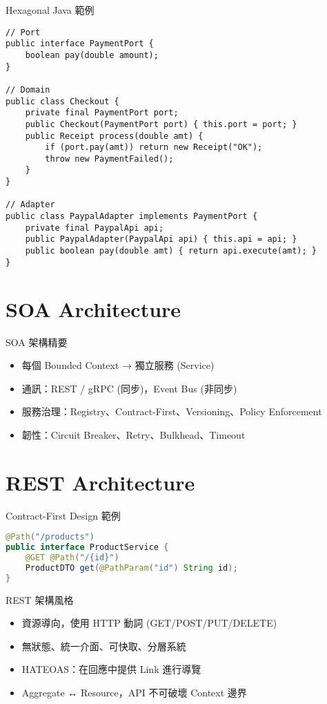\documentclass[UTF8]{beamer}
\begin{document}
\begin{frame}[fragile]{Hexagonal Java 範例}
    \begin{lstlisting}
// Port
public interface PaymentPort {
    boolean pay(double amount);
}

// Domain
public class Checkout {
    private final PaymentPort port;
    public Checkout(PaymentPort port) { this.port = port; }
    public Receipt process(double amt) {
        if (port.pay(amt)) return new Receipt("OK");
        throw new PaymentFailed();
    }
}

// Adapter
public class PaypalAdapter implements PaymentPort {
    private final PaypalApi api;
    public PaypalAdapter(PaypalApi api) { this.api = api; }
    public boolean pay(double amt) { return api.execute(amt); }
}
\end{lstlisting}
\end{frame}

\section{SOA Architecture}
\begin{frame}{SOA 架構精要}
    \begin{itemize}
        \item 每個 Bounded Context → 獨立服務 (Service)
        \item 通訊：REST / gRPC (同步)，Event Bus (非同步)
        \item 服務治理：Registry、Contract-First、Versioning、Policy Enforcement
        \item 韌性：Circuit Breaker、Retry、Bulkhead、Timeout
    \end{itemize}
\end{frame}

\section{REST Architecture}
\begin{frame}[fragile]{Contract-First Design 範例}
    \begin{lstlisting}[language=Java]
@Path("/products")
public interface ProductService {
    @GET @Path("/{id}")
    ProductDTO get(@PathParam("id") String id);
}
\end{lstlisting}
\end{frame}

\begin{frame}{REST 架構風格}
    \begin{itemize}
        \item 資源導向，使用 HTTP 動詞 (GET/POST/PUT/DELETE)
        \item 無狀態、統一介面、可快取、分層系統
        \item HATEOAS：在回應中提供 Link 進行導覽
        \item Aggregate ↔️ Resource，API 不可破壞 Context 邊界
    \end{itemize}
\end{frame}
\end{document}
